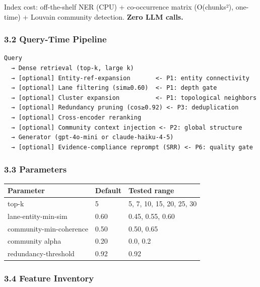 Index cost: off-the-shelf NER (CPU) + co-occurrence matrix (O(chunks²), one-time) + Louvain community detection. \textbf{Zero LLM calls.}

\subsubsection{3.2 Query-Time Pipeline}\label{query-time-pipeline}

\begin{small}
\begin{verbatim}
Query
  → Dense retrieval (top-k, large k)
  → [optional] Entity-ref-expansion       <- P1: entity connectivity
  → [optional] Lane filtering (sim≥0.60)  <- P1: depth gate
  → [optional] Cluster expansion          <- P1: topological neighbors
  → [optional] Redundancy pruning (cos≥0.92) <- P3: deduplication
  → [optional] Cross-encoder reranking
  → [optional] Community context injection <- P2: global structure
  → Generator (gpt-4o-mini or claude-haiku-4-5)
  → [optional] Evidence-compliance reprompt (SRR) <- P6: quality gate
\end{verbatim}
\end{small}

\subsubsection{3.3 Parameters}\label{parameters}

\begin{small}
\setlength{\tabcolsep}{4pt}
\begin{longtable}{p{1.8in}p{0.8in}p{3.0in}}
\toprule
\textbf{Parameter} & \textbf{Default} & \textbf{Tested range} \\
\midrule
\endhead
top-k & 5 & 5, 7, 10, 15, 20, 25, 30 \\
lane-entity-min-sim & 0.60 & 0.45, 0.55, 0.60 \\
community-min-coherence & 0.50 & 0.50, 0.65 \\
community alpha & 0.20 & 0.0, 0.2 \\
redundancy-threshold & 0.92 & 0.92 \\
\bottomrule
\end{longtable}
\end{small}

\subsubsection{3.4 Feature Inventory}\label{feature-inventory}

